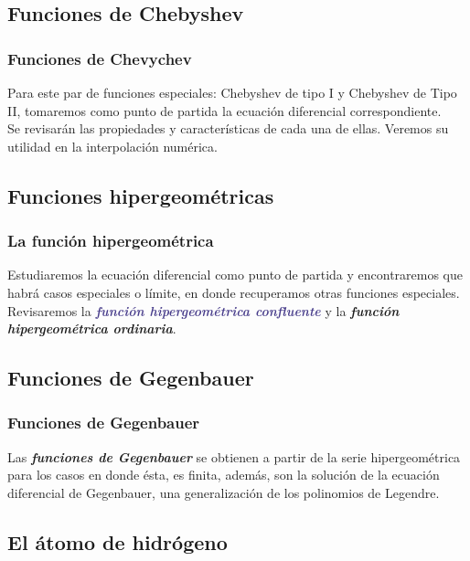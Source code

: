 \documentclass[12pt]{beamer}
\begin{document}
\subsection{Funciones de Chebyshev}

\begin{frame}
\frametitle{Funciones de Chevychev}
Para este par de funciones especiales: Chebyshev de tipo I y Chebyshev de Tipo II, tomaremos como punto de partida la ecuación diferencial correspondiente.
\\
\bigskip
\pause
Se revisarán las propiedades y características de cada una de ellas. Veremos su utilidad en la interpolación numérica.
\end{frame}

\subsection{Funciones hipergeométricas}

\begin{frame}
\frametitle{La función hipergeométrica}
Estudiaremos la ecuación diferencial como punto de partida y encontraremos que habrá casos especiales o límite, en donde recuperamos otras funciones especiales.
\\
\bigskip
Revisaremos la \emph{\textbf{\textcolor{darkslateblue}{función hipergeométrica confluente}}} \pause y la \emph{\textbf{\textcolor{denim}{función hipergeométrica ordinaria}}}.
\end{frame}

\subsection{Funciones de Gegenbauer}

\begin{frame}
\frametitle{Funciones de Gegenbauer}
Las \emph{\textbf{\textcolor{flame}{funciones de Gegenbauer}}} se obtienen a partir de la serie hipergeométrica para los casos en donde ésta, es finita, \pause además, son la solución de la ecuación diferencial de Gegenbauer, una generalización de los polinomios de Legendre.
\end{frame}

\subsection{El átomo de hidrógeno}
\end{document}
